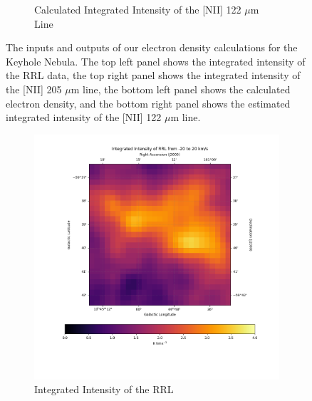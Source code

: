 \begin{figure}
\begin{subfigure}[t]{0.49\textwidth}
        \caption{Calculated Integrated Intensity of the [NII] 122 $\mu$m Line}
    \end{subfigure}
    \caption[Calculated Electron Density and {[}NII{]} 122 $\mu$m Maps for the Keyhole Nebula]{
        The inputs and outputs of our electron density calculations for the Keyhole Nebula.
        The top left panel shows the integrated intensity of the RRL data, the top right panel shows the integrated intensity of the [NII] 205 $\mu$m line, the bottom left panel shows the calculated electron density, and the bottom right panel shows the estimated integrated intensity of the [NII] 122 $\mu$m line.
        }
    \label{carina/fig:result_keyhole}
\end{figure}

\begin{figure}
    \centering
    \begin{subfigure}[t]{0.45\textwidth}
        \centering
        \includegraphics[width=\textwidth]{figs/carina/carina/rrl.png}
        \caption{Integrated Intensity of the RRL}
    \end{subfigure}
    \begin{subfigure}[t]{0.45\textwidth}
        \centering

\end{subfigure}
\end{figure}
